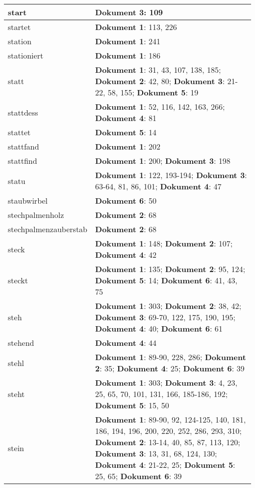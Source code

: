 \documentclass[a5paper]{article}
\begin{document}
\begin{longtable}[l]{|l|p{3in}|}
\hline
start & \textbf{Dokument 3}: 109 \\
\hline
startet & \textbf{Dokument 1}: 113, 226 \\
\hline
station & \textbf{Dokument 1}: 241 \\
\hline
stationiert & \textbf{Dokument 1}: 186 \\
\hline
statt & \textbf{Dokument 1}: 31, 43, 107, 138, 185; \textbf{Dokument 2}: 42, 80; \textbf{Dokument 3}: 21-22, 58, 155; \textbf{Dokument 5}: 19 \\
\hline
stattdess & \textbf{Dokument 1}: 52, 116, 142, 163, 266; \textbf{Dokument 4}: 81 \\
\hline
stattet & \textbf{Dokument 5}: 14 \\
\hline
stattfand & \textbf{Dokument 1}: 202 \\
\hline
stattfind & \textbf{Dokument 1}: 200; \textbf{Dokument 3}: 198 \\
\hline
statu & \textbf{Dokument 1}: 122, 193-194; \textbf{Dokument 3}: 63-64, 81, 86, 101; \textbf{Dokument 4}: 47 \\
\hline
staubwirbel & \textbf{Dokument 6}: 50 \\
\hline
stechpalmenholz & \textbf{Dokument 2}: 68 \\
\hline
stechpalmenzauberstab & \textbf{Dokument 2}: 68 \\
\hline
steck & \textbf{Dokument 1}: 148; \textbf{Dokument 2}: 107; \textbf{Dokument 4}: 42 \\
\hline
steckt & \textbf{Dokument 1}: 135; \textbf{Dokument 2}: 95, 124; \textbf{Dokument 5}: 14; \textbf{Dokument 6}: 41, 43, 75 \\
\hline
steh & \textbf{Dokument 1}: 303; \textbf{Dokument 2}: 38, 42; \textbf{Dokument 3}: 69-70, 122, 175, 190, 195; \textbf{Dokument 4}: 40; \textbf{Dokument 6}: 61 \\
\hline
stehend & \textbf{Dokument 4}: 44 \\
\hline
stehl & \textbf{Dokument 1}: 89-90, 228, 286; \textbf{Dokument 2}: 35; \textbf{Dokument 4}: 25; \textbf{Dokument 6}: 39 \\
\hline
steht & \textbf{Dokument 1}: 303; \textbf{Dokument 3}: 4, 23, 25, 65, 70, 101, 131, 166, 185-186, 192; \textbf{Dokument 5}: 15, 50 \\
\hline
stein & \textbf{Dokument 1}: 89-90, 92, 124-125, 140, 181, 186, 194, 196, 200, 220, 252, 286, 293, 310; \textbf{Dokument 2}: 13-14, 40, 85, 87, 113, 120; \textbf{Dokument 3}: 13, 31, 68, 124, 130; \textbf{Dokument 4}: 21-22, 25; \textbf{Dokument 5}: 25, 65; \textbf{Dokument 6}: 39 \\

\end{longtable}
\end{document}
